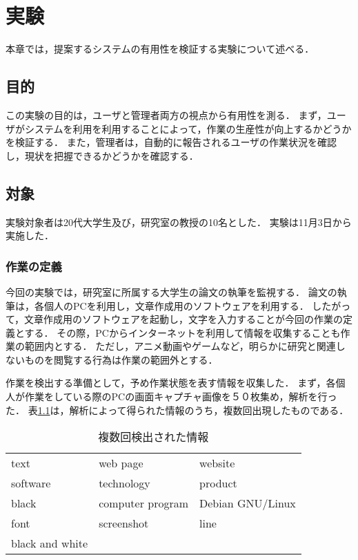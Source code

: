 \chapter{実験}
本章では，提案するシステムの有用性を検証する実験について述べる．

\section{目的}
この実験の目的は，ユーザと管理者両方の視点から有用性を測る．
まず，ユーザがシステムを利用を利用することによって，作業の生産性が向上するかどうかを検証する．
また，管理者は，自動的に報告されるユーザの作業状況を確認し，現状を把握できるかどうかを確認する．

\section{対象}
実験対象者は20代大学生及び，研究室の教授の10名とした．
実験は11月3日から実施した．

\subsection{作業の定義}
今回の実験では，研究室に所属する大学生の論文の執筆を監視する．
論文の執筆は，各個人のPCを利用し，文章作成用のソフトウェアを利用する．
したがって，文章作成用のソフトウェアを起動し，文字を入力することが今回の作業の定義とする．
その際，PCからインターネットを利用して情報を収集することも作業の範囲内とする．
ただし，アニメ動画やゲームなど，明らかに研究と関連しないものを閲覧する行為は作業の範囲外とする．

作業を検出する準備として，予め作業状態を表す情報を収集した．
まず，各個人が作業をしている際のPCの画面キャプチャ画像を５０枚集め，解析を行った．
表\ref{tab:positive_words}は，解析によって得られた情報のうち，複数回出現したものである．

\begin{table}[htb]
  \begin{center}
    \begin{tabular}{lll}
      text & web page & website \\
      software & technology & product  \\
      black & computer program & Debian GNU/Linux \\
      font & screenshot & line \\
      black and white & &
    \end{tabular}
    \caption{複数回検出された情報}
    \label{tab:positive_words}
  \end{center}
\end{table}

